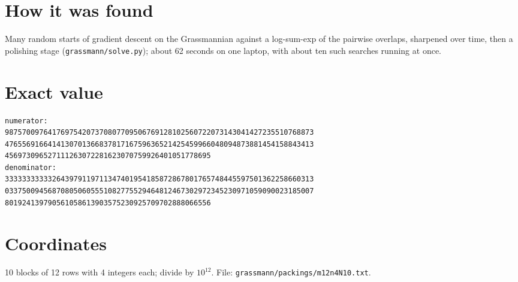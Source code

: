 \documentclass[11pt,a4paper]{article}
\begin{document}
\section{How it was found}
Many random starts of gradient descent on the Grassmannian against a log-sum-exp of the pairwise overlaps, sharpened over time, then a polishing stage (\texttt{grassmann/solve.py}); about 62 seconds on one laptop, with about ten such searches running at once.


\appendix
\section{Exact value}
{\small
\begin{verbatim}
numerator:
987570097641769754207370807709506769128102560722073143041427235510768873
476556916641413070136683781716759636521425459966048094873881454158843413
456973096527111263072281623070759926401051778695
denominator:
333333333332643979119711347401954185872867801765748445597501362258660313
033750094568708050605551082775529464812467302972345230971059090023185007
801924139790561058613903575230925709702888066556
\end{verbatim}}

\section{Coordinates}
10 blocks of 12 rows with 4 integers each; divide by $10^{12}$. File: \texttt{grassmann/packings/m12n4N10.txt}.
{\tiny
\begin{multicols}{3}
\end{multicols}}
\end{document}
